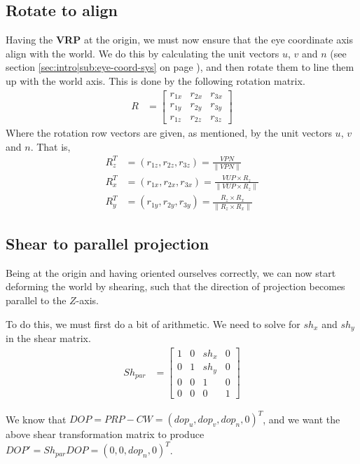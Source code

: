 \documentclass[11pt]{article}
\newcommand{\secref}[1]{see section \ref{#1} on page \pageref{#1}}
\newcommand{\norm}[1]{\lVert#1\rVert}
\newcommand{\unit}[1]{\frac{#1}{\norm{#1}}}
\begin{document}
\subsection{Rotate to align}
\label{sec:canonical-parallel-view-volume|sub:rotate-to-align}
Having the {\bf VRP} at the origin, we must now ensure that the eye coordinate
axis align with the world. We do this by calculating the unit vectors $u$, $v$
and $n$ (\secref{sec:intro|sub:eye-coord-sys}), and then rotate them to line
them up with the world axis. This is done by the following rotation matrix.
\begin{align}
    R &=
    \begin{bmatrix}
        r_{1x} & r_{2x} & r_{3x} \\
        r_{1y} & r_{2y} & r_{3y} \\
        r_{1z} & r_{2z} & r_{3z}
    \end{bmatrix}
\end{align}
Where the rotation row vectors are given, as mentioned, by the unit vectors
$u$, $v$ and $n$. That is,
\begin{align}
    R_z^T &= (r_{1z}, r_{2z}, r_{3z}) = \unit{VPN} \\
    R_x^T &= (r_{1x}, r_{2x}, r_{3x}) = \unit{VUP \times R_z} \\
    R_y^T &= (r_{1y}, r_{2y}, r_{3y}) = \unit{R_z \times R_x}
\end{align}

\subsection{Shear to parallel projection}
\label{sec:canonical-parallel-view-volume|sub:shear-to-parallel}
Being at the origin and having oriented ourselves correctly, we can now start
deforming the world by shearing, such that the direction of projection becomes
parallel to the $Z$-axis.

To do this, we must first do a bit of arithmetic. We need to solve for $sh_x$
and $sh_y$ in the shear matrix.
\begin{align}
    Sh_{par} &=
    \begin{bmatrix}
        1 & 0 & sh_x & 0 \\
        0 & 1 & sh_y & 0 \\
        0 & 0 & 1 & 0 \\
        0 & 0 & 0 & 1
    \end{bmatrix}
\end{align}

We know that $DOP = PRP - CW = (dop_u, dop_v, dop_n, 0)^T$, and we want the
above shear transformation matrix to produce $DOP' = Sh_{par}DOP = (0, 0,
dop_n, 0)^T$.
\end{document}

